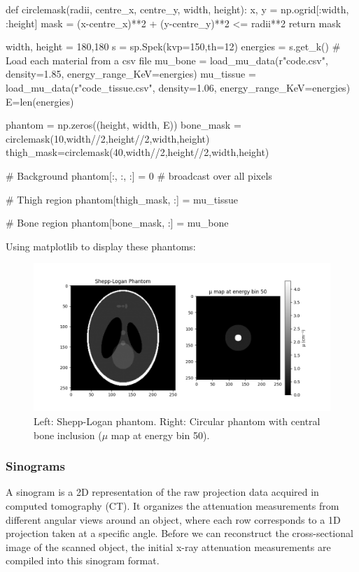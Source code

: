 \documentclass{article}
\begin{document}
\begin{python}
def circlemask(radii, centre_x, centre_y, width, height):
    x, y = np.ogrid[:width, :height]
    mask = (x-centre_x)**2 + (y-centre_y)**2 <= radii**2
    return mask
   
width, height = 180,180
s = sp.Spek(kvp=150,th=12)
energies = s.get_k()
# Load each material from a csv file
mu_bone = load_mu_data(r"code\bone.csv", density=1.85, energy_range_KeV=energies)
mu_tissue = load_mu_data(r"code\soft_tissue.csv", density=1.06, energy_range_KeV=energies)
E=len(energies)

phantom = np.zeros((height, width, E))
bone_mask = circlemask(10,width//2,height//2,width,height)
thigh_mask=circlemask(40,width//2,height//2,width,height)

# Background
phantom[:, :, :] = 0  # broadcast over all pixels

# Thigh region
phantom[thigh_mask, :] = mu_tissue

# Bone region
phantom[bone_mask, :] = mu_bone
\end{python}

Using matplotlib to display these phantoms:

\begin{figure}[H]
	\includegraphics[width=\linewidth]{simplephantom.png}
	\caption{Left: Shepp-Logan phantom. Right: Circular phantom with central bone inclusion ($\mu$ map at energy bin 50).}
	\label{fig:phantoms}
\end{figure}

\subsubsection{Sinograms}
A sinogram is a 2D representation of the raw projection data acquired in computed tomography (CT). It organizes the attenuation measurements from different angular views around an object, where each row corresponds to a 1D projection taken at a specific angle. Before we can reconstruct the cross-sectional image of the scanned object, the initial x-ray attenuation measurements are compiled into this sinogram format.
\end{document}
